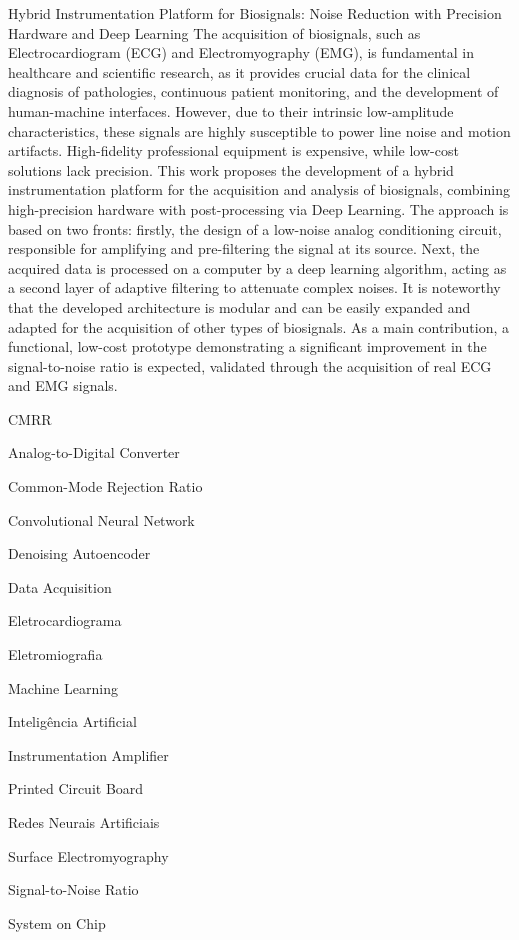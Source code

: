 \documentclass[tcc,capa]{texufpel}
\begin{document}
\begin{englishabstract}{Hybrid Instrumentation Platform for Biosignals: Noise Reduction with Precision Hardware and Deep Learning}
  The acquisition of biosignals, such as Electrocardiogram (ECG) and Electromyography (EMG), is fundamental in healthcare and scientific research, as it provides crucial data for the clinical diagnosis of pathologies, continuous patient monitoring, and the development of human-machine interfaces. However, due to their intrinsic low-amplitude characteristics, these signals are highly susceptible to power line noise and motion artifacts. High-fidelity professional equipment is expensive, while low-cost solutions lack precision. This work proposes the development of a hybrid instrumentation platform for the acquisition and analysis of biosignals, combining high-precision hardware with post-processing via Deep Learning. The approach is based on two fronts: firstly, the design of a low-noise analog conditioning circuit, responsible for amplifying and pre-filtering the signal at its source. Next, the acquired data is processed on a computer by a deep learning algorithm, acting as a second layer of adaptive filtering to attenuate complex noises. It is noteworthy that the developed architecture is modular and can be easily expanded and adapted for the acquisition of other types of biosignals. As a main contribution, a functional, low-cost prototype demonstrating a significant improvement in the signal-to-noise ratio is expected, validated through the acquisition of real ECG and EMG signals.
\end{englishabstract}

\listoffigures
\listoftables

\begin{listofabbrv}{CMRR} %
    \item[ADC] Analog-to-Digital Converter
    \item[CMRR] Common-Mode Rejection Ratio
    \item[CNN] Convolutional Neural Network
    \item[DAE] Denoising Autoencoder
    \item[DAQ] Data Acquisition
    \item[ECG] Eletrocardiograma
    \item[EMG] Eletromiografia
    \item[ML] Machine Learning
    \item[IA] Inteligência Artificial
    \item[INA] Instrumentation Amplifier
    \item[PCB] Printed Circuit Board
    \item[RNAs] Redes Neurais Artificiais
    \item[sEMG] Surface Electromyography
    \item[SNR] Signal-to-Noise Ratio
    \item[SoC] System on Chip
\end{listofabbrv}
\end{document}
